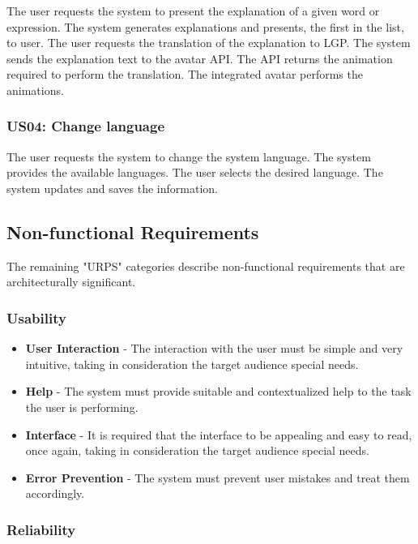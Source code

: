 The user requests the system to present the explanation of a given word or expression.
The system generates explanations and presents, the first in the list, to user.
The user requests the translation of the explanation to \gls{LGP}.
The system sends the explanation text to the avatar API.
The API returns the animation required to perform the translation.
The integrated avatar performs the animations.

\subsubsection{US04: Change language}

The user requests the system to change the system language.
The system provides the available languages.
The user selects the desired language.
The system updates and saves the information.

\subsection{Non-functional Requirements}

The remaining "URPS" categories describe non-functional requirements that are architecturally significant.

\subsubsection{Usability}

\begin{itemize}
    \item \textbf{User Interaction} - The interaction with the user must be simple and very intuitive, taking in consideration the target audience special needs.
    \item \textbf{Help} - The system must provide suitable and contextualized help to the task the user is performing.
    \item \textbf{Interface} - It is required that the interface to be appealing and easy to read, once again, taking in consideration the target audience special needs.
    \item \textbf{Error Prevention} - The system must prevent user mistakes and treat them accordingly.
\end{itemize}

\subsubsection{Reliability}

